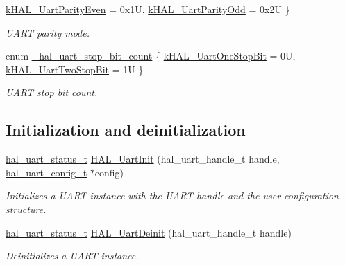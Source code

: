 \begin{DoxyCompactItemize}
\mbox{\hyperlink{group___u_a_r_t___adapter_gga4bfc5f54ba1569ae2dfcc1d7ae0be0f3ad5aa4e9333286303c2aacaf0720d0393}{k\+H\+A\+L\+\_\+\+Uart\+Parity\+Even}} = 0x1U, 
\mbox{\hyperlink{group___u_a_r_t___adapter_gga4bfc5f54ba1569ae2dfcc1d7ae0be0f3abf5f4cdb5e90b0fc1c3e079d305cb90d}{k\+H\+A\+L\+\_\+\+Uart\+Parity\+Odd}} = 0x2U
 \}
\begin{DoxyCompactList}\small\item\em U\+A\+RT parity mode. \end{DoxyCompactList}\item 
enum \mbox{\hyperlink{group___u_a_r_t___adapter_gac8e83321127267d2bed1659d4227f050}{\+\_\+hal\+\_\+uart\+\_\+stop\+\_\+bit\+\_\+count}} \{ \mbox{\hyperlink{group___u_a_r_t___adapter_ggac8e83321127267d2bed1659d4227f050a34f5d0e676eead962173aa956b850476}{k\+H\+A\+L\+\_\+\+Uart\+One\+Stop\+Bit}} = 0U, 
\mbox{\hyperlink{group___u_a_r_t___adapter_ggac8e83321127267d2bed1659d4227f050ab4bec3351a5a5818347a899989cd65e4}{k\+H\+A\+L\+\_\+\+Uart\+Two\+Stop\+Bit}} = 1U
 \}
\begin{DoxyCompactList}\small\item\em U\+A\+RT stop bit count. \end{DoxyCompactList}\end{DoxyCompactItemize}
\subsection*{Initialization and deinitialization}
\begin{DoxyCompactItemize}
\item 
\mbox{\hyperlink{group___u_a_r_t___adapter_ga352ee9bdc398eba4262ca7656f9c5e50}{hal\+\_\+uart\+\_\+status\+\_\+t}} \mbox{\hyperlink{group___u_a_r_t___adapter_gac234c4bcffe995d8aa1b2392162af796}{H\+A\+L\+\_\+\+Uart\+Init}} (hal\+\_\+uart\+\_\+handle\+\_\+t handle, \mbox{\hyperlink{group___u_a_r_t___adapter_ga1545cbd3c961cbe725ed2a75ffc5a999}{hal\+\_\+uart\+\_\+config\+\_\+t}} $\ast$config)
\begin{DoxyCompactList}\small\item\em Initializes a U\+A\+RT instance with the U\+A\+RT handle and the user configuration structure. \end{DoxyCompactList}\item 
\mbox{\hyperlink{group___u_a_r_t___adapter_ga352ee9bdc398eba4262ca7656f9c5e50}{hal\+\_\+uart\+\_\+status\+\_\+t}} \mbox{\hyperlink{group___u_a_r_t___adapter_gab68259998677f787072799042ed0ce34}{H\+A\+L\+\_\+\+Uart\+Deinit}} (hal\+\_\+uart\+\_\+handle\+\_\+t handle)
\begin{DoxyCompactList}\small\item\em Deinitializes a U\+A\+RT instance. \end{DoxyCompactList}\end{DoxyCompactItemize}
